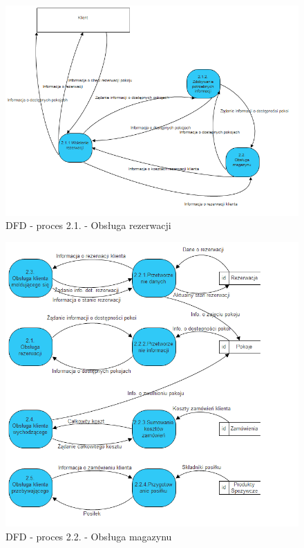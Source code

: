 \documentclass[a4paper, 11pt]{article}
\begin{document}
	\begin{figure}[H]%
			\center
			\includegraphics[scale=0.8]{Img/2-1.png}
			\caption{DFD - proces 2.1. - Obsługa rezerwacji}
	\end{figure}
	\begin{figure}[H]%
			\center
			\includegraphics[scale=1.0]{Img/2-2.png}
			\caption{DFD - proces 2.2. - Obsługa magazynu}
	\end{figure}
\end{document}
